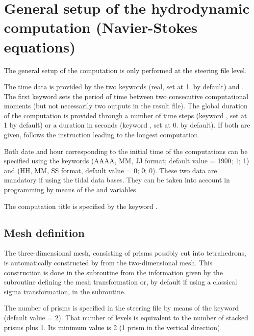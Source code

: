 \chapter{General setup of the hydrodynamic computation (Navier-Stokes equations)}

The general setup of the computation is only performed at the steering file
level.

The time data is provided by the two keywords  (real, set at
1. by default) and . The first keyword sets the
period of time between two consecutive computational moments (but not
necessarily two outputs in the result file). The global duration of the
computation is provided through a number of time steps (keyword , set at 1 by default) or a duration in seconds (keyword
, set at 0. by default). If both are given,  follows
the instruction leading to the longest computation.

Both date and hour corresponding to the initial time of the computations can be
specified using the keywords 
(AAAA, MM, JJ format; default value = 1900; 1; 1) and  (HH, MM, SS format, default value = 0; 0; 0).
These two data are mandatory if using the tidal data bases.
They can be taken into account in programming by means of the 
and  variables.

The computation title is specified by the keyword .


\section{Mesh definition}

The three-dimensional mesh, consisting of prisms possibly cut into
tetrahedrons, is automatically constructed by  from the
two-dimensional mesh. This construction is done in the 
subroutine from the information given by the subroutine defining the
mesh transformation  or, by default if using a
classical sigma transformation, in the  subroutine.

The number of prisms is specified in the steering file by means of the keyword
 (default value = 2). That number of levels
is equivalent to the number of stacked prisms plus 1. Its minimum value is 2 (1
prism in the vertical direction).

